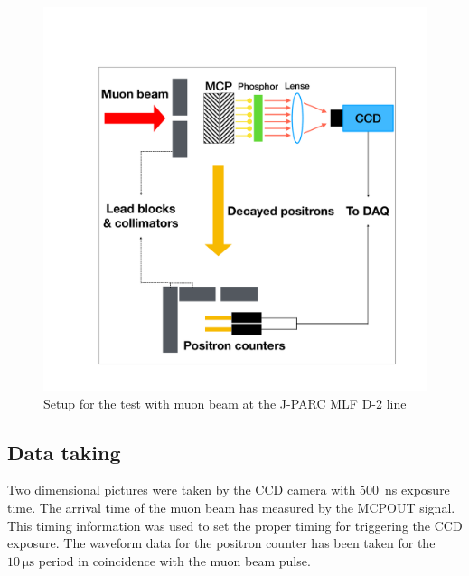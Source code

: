 \documentclass[preprint,3p,twocolumn]{elsarticle}
\begin{document}
\begin{figure}[tb]
{\setlength{\belowdisplayskip}{0pt}
\begin{minipage}[t]{60mm}
\includegraphics[width=1.25\textwidth, height=1.25\textwidth]{figure/BPM_schematic.pdf}
\end{minipage}
}
\caption{Setup for the test with muon beam at the J-PARC MLF D-2 line}
\vspace{-0.4cm}
\label{fig:simulation}
\end{figure}

\subsection{Data taking} 
Two dimensional pictures were taken by the CCD camera with \SI{500}{\nano\s} exposure time.
The arrival time of the muon beam has measured by the MCPOUT signal. This timing information was used 
to set the proper timing for triggering the CCD exposure. The waveform data for the positron counter has been taken for the $\SI{10}{\micro\s}$ period in coincidence with the muon beam pulse.
\end{document}
